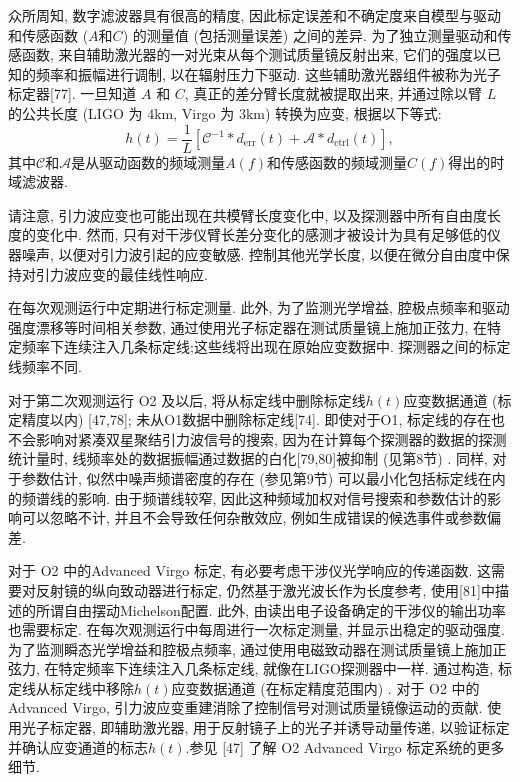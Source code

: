 \documentclass[a4paper]{\documentclassname}
\def\t{\text}
\theoremstyle{definition}
\begin{document}
众所周知, 数字滤波器具有很高的精度, 因此标定误差和不确定度来自模型与驱动和传感函数 ($A$和$C$) 的测量值 (包括测量误差) 之间的差异. 为了独立测量驱动和传感函数, 来自辅助激光器的一对光束从每个测试质量镜反射出来, 它们的强度以已知的频率和振幅进行调制, 以在辐射压力下驱动. 这些辅助激光器组件被称为光子标定器[77]. 一旦知道 $A$ 和 $C$, 真正的差分臂长度就被提取出来, 并通过除以臂 $L$ 的公共长度 (LIGO 为 $4 \t{km}$, Virgo 为 $3 \t{km}$) 转换为应变, 根据以下等式:
\begin{equation}
    h(t)=\frac{1}{L}\left[\mathcal{C}^{-1}\ast d_{\t{err}}(t)+\mathcal{A}\ast d_{\t{ctrl}}(t)\right],
\end{equation}
其中$\mathcal{C}$和$\mathcal{A}$是从驱动函数的频域测量$A (f) $和传感函数的频域测量$C (f) $得出的时域滤波器.

请注意, 引力波应变也可能出现在共模臂长度变化中, 以及探测器中所有自由度长度的变化中. 然而, 只有对干涉仪臂长差分变化的感测才被设计为具有足够低的仪器噪声, 以便对引力波引起的应变敏感. 控制其他光学长度, 以便在微分自由度中保持对引力波应变的最佳线性响应. 

在每次观测运行中定期进行标定测量. 此外, 为了监测光学增益, 腔极点频率和驱动强度漂移等时间相关参数, 通过使用光子标定器在测试质量镜上施加正弦力, 在特定频率下连续注入几条标定线;这些线将出现在原始应变数据中. 探测器之间的标定线频率不同. 

对于第二次观测运行 O2 及以后, 将从标定线中删除标定线$h(t)$应变数据通道 (标定精度以内) [47,78]; 未从O1数据中删除标定线[74]. 即使对于O1, 标定线的存在也不会影响对紧凑双星聚结引力波信号的搜索, 因为在计算每个探测器的数据的探测统计量时, 线频率处的数据振幅通过数据的白化[79,80]被抑制 (见第8节) .  同样, 对于参数估计, 似然中噪声频谱密度的存在 (参见第9节) 可以最小化包括标定线在内的频谱线的影响. 由于频谱线较窄, 因此这种频域加权对信号搜索和参数估计的影响可以忽略不计, 并且不会导致任何杂散效应, 例如生成错误的候选事件或参数偏差. 

对于 O2 中的Advanced Virgo 标定, 有必要考虑干涉仪光学响应的传递函数. 这需要对反射镜的纵向致动器进行标定, 仍然基于激光波长作为长度参考, 使用[81]中描述的所谓自由摆动Michelson配置. 此外, 由读出电子设备确定的干涉仪的输出功率也需要标定. 在每次观测运行中每周进行一次标定测量, 并显示出稳定的驱动强度. 为了监测瞬态光学增益和腔极点频率, 通过使用电磁致动器在测试质量镜上施加正弦力, 在特定频率下连续注入几条标定线, 就像在LIGO探测器中一样. 通过构造, 标定线从标定线中移除$h(t)$应变数据通道 (在标定精度范围内) . 对于 O2 中的Advanced Virgo, 引力波应变重建消除了控制信号对测试质量镜像运动的贡献. 使用光子标定器, 即辅助激光器, 用于反射镜子上的光子并诱导动量传递, 以验证标定并确认应变通道的标志$h(t)$.参见 [47] 了解 O2 Advanced Virgo 标定系统的更多细节. 
\end{document}
